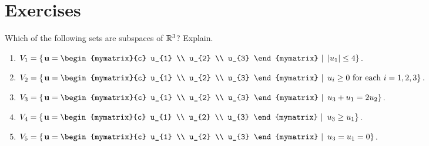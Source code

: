 \section*{Exercises}


\begin{ex}
  Which of the following sets are subspaces of $\mathbb{R}^3$? Explain.
  \begin{enumerate}
  \item $V_1=\set{\left.\vect{u}=\begin{mymatrix}{c}
          u_{1} \\ u_{2} \\ u_{3}
        \end{mymatrix}~\right\vert~ \abs{u_{1}} \leq 4}$.
  \item $V_2=\set{\left.\vect{u}=\begin{mymatrix}{c}
          u_{1} \\ u_{2} \\ u_{3}
        \end{mymatrix}~\right\vert~ u_{i}\geq 0\text{ for each }i=1,2,3}$.
  \item $V_3=\set{\left.\vect{u}=\begin{mymatrix}{c}
          u_{1} \\ u_{2} \\ u_{3}
        \end{mymatrix}~\right\vert~ u_{3}+u_{1}=2u_{2}}$.
  \item $V_4=\set{\left.\vect{u}=\begin{mymatrix}{c}
          u_{1} \\ u_{2} \\ u_{3}
        \end{mymatrix}~\right\vert~ u_{3}\geq u_{1}}$.
  \item $V_5=\set{\left.\vect{u}=\begin{mymatrix}{c}
          u_{1} \\ u_{2} \\ u_{3}
        \end{mymatrix}~\right\vert~ u_{3}=u_{1}=0}$.
  \end{enumerate}


\end{ex}
